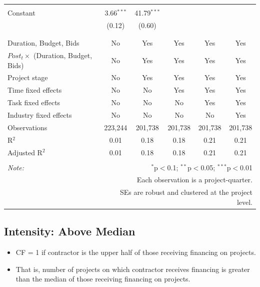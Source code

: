 \documentclass[
]{article}
\providecommand{\tightlist}{%
  \setlength{\itemsep}{0pt}\setlength{\parskip}{0pt}}
\begin{document}
\begin{table}[H]
\begin{tabular}{@{\extracolsep{-2pt}}lccccc}
  & & & & & \\ 
 Constant & 3.66$^{***}$ & 41.79$^{***}$ &  &  &  \\ 
  & (0.12) & (0.60) &  &  &  \\ 
  & & & & & \\ 
\hline \\[-1.8ex] 
Duration, Budget, Bids & No & Yes & Yes & Yes & Yes \\ 
$Post_t \times $  (Duration, Budget, Bids) & No & Yes & Yes & Yes & Yes \\ 
Project stage & No & Yes & Yes & Yes & Yes \\ 
Time fixed effects & No & No & Yes & Yes & Yes \\ 
Task fixed effects & No & No & No & Yes & Yes \\ 
Industry fixed effects & No & No & No & No & Yes \\ 
Observations & 223,244 & 201,738 & 201,738 & 201,738 & 201,738 \\ 
R$^{2}$ & 0.01 & 0.18 & 0.18 & 0.21 & 0.21 \\ 
Adjusted R$^{2}$ & 0.01 & 0.18 & 0.18 & 0.21 & 0.21 \\ 
\hline 
\hline \\[-1.8ex] 
\textit{Note:}  & \multicolumn{5}{r}{$^{*}$p$<$0.1; $^{**}$p$<$0.05; $^{***}$p$<$0.01} \\ 
 & \multicolumn{5}{r}{Each observation is a project-quarter.} \\ 
 & \multicolumn{5}{r}{SEs are robust and clustered at the project level.} \\ 
\end{tabular} 
\end{table}

\hypertarget{intensity-above-median}{%
\subsection{Intensity: Above Median}\label{intensity-above-median}}

\begin{itemize}
\tightlist
\item
  CF = 1 if contractor is the upper half of those receiving financing on
  projects.
\item
  That is, number of projects on which contractor receives financing is
  greater than the median of those receiving financing on projects.
\end{itemize}
\end{document}
